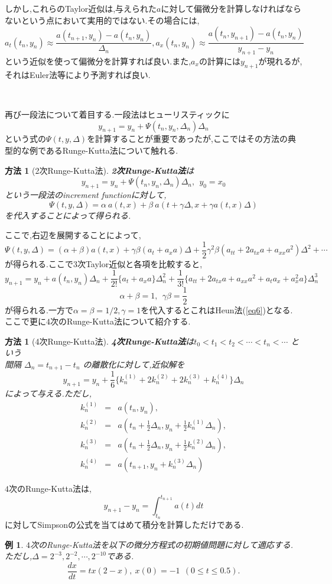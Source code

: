 \documentclass[a4paper,dvipdfmx]{jreport}
\numberwithin{equation}{section}
\newtheorem{Ex}      [Thm]{例}
\newtheorem{Method}[Thm]{方法}
\renewenvironment{leftbar}{%
  \def\FrameCommand{\vrule width 1pt \hspace{10pt}}%
  \MakeFramed {\advance\hsize-\width \FrameRestore}}%
 {\endMakeFramed}
\def\method{\begin{leftbar}\begin{Method}}
\def\methodx{\end{Method}\end{leftbar}}
\def\ex{\begin{Ex}}
\def\exx{\end{Ex}}
\def\eq{\begin{equation}}
\def\eqx{\end{equation}}
\def\eqa{\begin{eqnarray}}
\def\eqax{\end{eqnarray}}
\begin{document}
しかし,これらのTaylor近似は,与えられた$a$に対して偏微分を計算しなければならないという点において実用的ではない.その場合には,
\eq
a_t(t_n,y_n) \approx \frac{a(t_{n+1},y_n) - a(t_n,y_n)}{\Delta_n},
a_x(t_n,y_n) \approx \frac{a(t_n,y_{n+1}) - a(t_n,y_n)}{y_{n+1} -y_n}
\eqx
という近似を使って偏微分を計算すれば良い.また,$a_x$の計算には$y_{n+1}$が現れるが,
それはEuler法等により予測すれば良い.\par
\


再び一段法について着目する.一段法はヒューリスティックに
\eq
y_{n+1} = y_n + \Psi(t_n,y_n,\Delta_n) \Delta_n
\eqx
という式の$\Psi(t,y,\Delta)$を計算することが重要であったが,ここではその方法の典型的な例であるRunge-Kutta法について触れる.
\method[2次Runge-Kutta法]
{\bf 2次Runge-Kutta法}は 
\eq
y_{n+1} = y_n + \Psi(t_n,y_n,\Delta_n) \Delta_n,\  \  y_0 = x_0
\eqx
という一段法のincrement functionに対して,
\eq
\Psi(t,y,\Delta) = \alpha \: a(t,x) + \beta \: a(t+\gamma \Delta, x + \gamma a(t,x) \Delta)
\eqx
を代入することによって得られる.
\methodx
ここで,右辺を展開することによって,
\[
\Psi(t,y,\Delta) = (\alpha + \beta)a(t,x) + \gamma \beta(a_t + a_x a )\Delta
+ \frac{1}{2}  \gamma^2 \beta (a_{tt} + 2a_{tx}a + a_{xx}a^2)\Delta^2 + \cdots
\]
が得られる.ここで$3$次Taylor近似と各項を比較すると,
\[
y_{n+1} = y_n + a(t_n,y_n)\Delta_n + \frac{1}{2!}\{ a_t + a_x a \} \Delta_n^2
+\frac{1}{3!}\{ a_{tt} + 2a_{tx}a + a_{xx}a^2 + a_ta_x +a_x^2 a \} \Delta_n^3
\]
\[
\alpha + \beta = 1 ,\ \ \gamma \beta = \frac{1}{2}
\]
が得られる.一方で$\alpha = \beta = 1/2, \gamma =1$を代入するとこれはHeun法(\ref{eq6})となる.
ここで更に$4$次のRunge-Kutta法について紹介する.
\method[4次Runge-Kutta法]
{\bf 4次Runge-Kutta法}は$ t_0 < t_1 < t_2 < \cdots < t_n < \cdots $ という\\
間隔 $\Delta_n = t_{n+1} - t_{n}$ の離散化に対して,近似解を
\eq
y_{n+1} = y_n + \frac{1}{6} \{ k_n^{(1)} +
2k_n^{(2)}+ 2k_n^{(3)} +  k_n^{(4)} \} \Delta_n
\eqx
によって与える.ただし,
\eqa
 k_n^{(1)} &=&  a(t_n,y_n),\\
 k_n^{(2)} &=&  a\left(t_n+ \frac{1}{2} \Delta_n ,y_n + \frac{1}{2} k_n^{(1)} \Delta_n\right),\\
 k_n^{(3)} &=&  a\left(t_n+ \frac{1}{2} \Delta_n ,y_n + \frac{1}{2} k_n^{(2)} \Delta_n\right),\\
 k_n^{(4)} &=&  a\left(t_{n+1} ,y_n + k_n^{(3)} \Delta_n\right)
\eqax
\methodx
$4$次のRunge-Kutta法は,
\[
y_{n+1} - y_{n} = \int_{t_n}^{t_{n+1}} a(t) dt 
\]
に対してSimpsonの公式を当てはめて積分を計算しただけである.\\
\ex
$4$次のRunge-Kutta法を以下の微分方程式の初期値問題に対して適応する.
ただし,$\Delta = 2^{-3},2^{-2},\cdots,2^{-10}$である.
\[
\frac{dx}{dt} = tx(2-x) , \  x(0) = -1\ \  (0 \le t \le 0.5). 
\]
\exx
\end{document}

